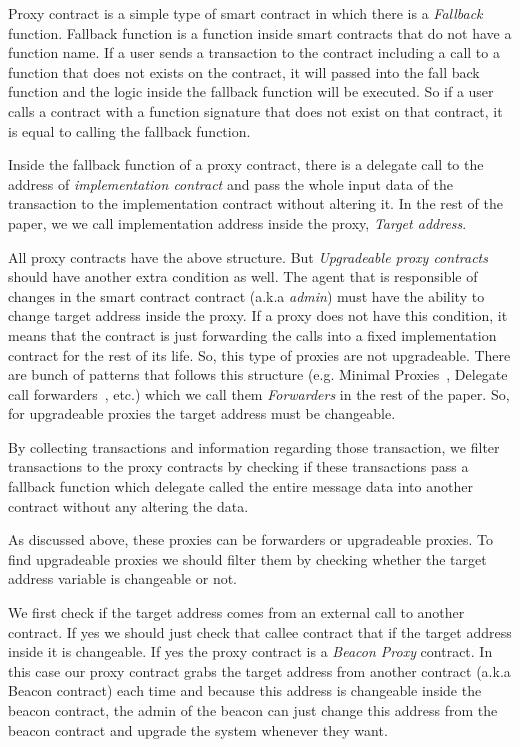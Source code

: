 Proxy contract is a simple type of smart contract in which there is a \textit{Fallback} function. Fallback function is a function inside smart contracts that do not have a function name. If a user sends a transaction to the contract including a call to a function that does not exists on the contract, it will passed into the fall back function and the logic inside the fallback function will be executed. So if a user calls a contract with a function signature that does not exist on that contract, it is equal to calling the fallback function.

Inside the fallback function of a proxy contract, there is a delegate call to the address of \textit{implementation contract} and pass the whole input data of the transaction to the implementation contract without altering it. In the rest of the paper, we we call implementation address inside the proxy, \emph{Target address}.

All proxy contracts have the above structure. But \textit{Upgradeable proxy contracts} should have another extra condition as well. The agent that is responsible of changes in the smart contract contract (a.k.a \emph{admin}) must have the ability to change target address inside the proxy. If a proxy does not have this condition, it means that the contract is just forwarding the calls into a fixed implementation contract for the rest of its life. So, this type of proxies are not upgradeable. There are bunch of patterns that follows this structure (e.g. Minimal Proxies~\cite{minimalProxy}, Delegate call forwarders~\cite{delegatecallForwarders}, etc.) which we call them \textit{Forwarders} in the rest of the paper. So, for upgradeable proxies the target address must be changeable.

By collecting transactions and information regarding those transaction, we filter transactions to the proxy contracts by checking if these transactions pass a fallback function which delegate called the entire message data into another contract without any altering the data.

As discussed above, these proxies can be forwarders or upgradeable proxies. To find upgradeable proxies we should filter them by checking whether the target address variable is changeable or not.

We first check if the target address comes from an external call to another contract. If yes we should just check that callee contract that if the target address inside it is changeable. If yes the proxy contract is a \textit{Beacon Proxy} contract. In this case our proxy contract grabs the target address from another contract (a.k.a Beacon contract) each time and because this address is changeable inside the beacon contract, the admin of the beacon can just change this address from the beacon contract and upgrade the system whenever they want.

